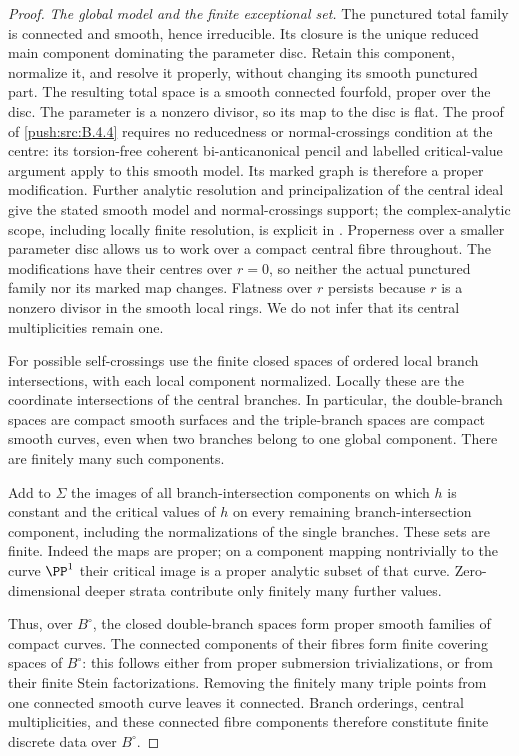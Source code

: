 \begin{proof}
\emph{The global model and the finite exceptional set.}
The punctured total family is connected and smooth, hence
irreducible. Its closure is the unique reduced main component
dominating the parameter disc. Retain this component, normalize
it, and resolve it properly, without changing its smooth
punctured part. The resulting total space is a smooth connected
fourfold, proper over the disc. The parameter is a nonzero
divisor, so its map to the disc is flat. The proof of \ref{push:src:B.4.4}
requires no reducedness or normal-crossings condition at the
centre: its torsion-free coherent bi-anticanonical pencil and
labelled critical-value argument apply to this smooth model.
Its marked graph is therefore a proper modification.
Further analytic resolution and principalization of the central
ideal give the stated smooth
model and normal-crossings support; the complex-analytic scope,
including locally finite resolution, is explicit in
\citet[Theorems 1.6 and 1.10 and the paragraph following
Theorem 1.6]{BM95AB}. Properness over a smaller parameter disc
allows us to work over a compact central fibre throughout.
The modifications have their centres over $r=0$, so neither
the actual punctured family nor its marked map changes.
Flatness over $r$ persists because $r$ is a nonzero divisor in
the smooth local rings. We do not infer that its central
multiplicities remain one.

For possible self-crossings use the finite closed spaces of
ordered local branch intersections, with each local component
normalized. Locally these are the coordinate intersections of
the central branches. In particular, the double-branch spaces
are compact smooth surfaces and the triple-branch spaces are
compact smooth curves, even when two branches belong to one
global component. There are finitely many such components.

Add to $\Sigma$ the images of all branch-intersection components
on which $h$ is constant and the critical values of $h$ on every
remaining branch-intersection component, including the
normalizations of the single branches. These sets are finite.
Indeed the maps are proper; on a component mapping nontrivially
to the curve $\PP^1$ their critical image is a proper analytic
subset of that curve. Zero-dimensional deeper strata contribute
only finitely many further values.

Thus, over $B^\circ$, the closed double-branch spaces form
proper smooth families of compact curves. The connected
components of their fibres form finite covering spaces of
$B^\circ$: this follows either from proper submersion
trivializations, or from their finite Stein factorizations.
Removing the finitely many triple points from one connected
smooth curve leaves it connected. Branch orderings, central
multiplicities, and these connected fibre components therefore
constitute finite discrete data over $B^\circ$.


\end{proof}
